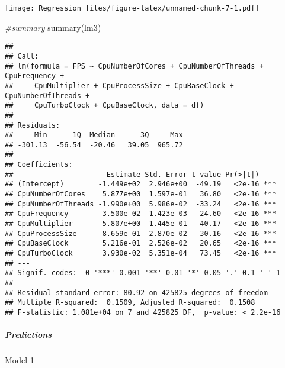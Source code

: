 \documentclass[
]{article}
\newenvironment{Shaded}{\begin{snugshade}}{\end{snugshade}}
\newcommand{\AttributeTok}[1]{\textcolor[rgb]{0.77,0.63,0.00}{#1}}
\newcommand{\CommentTok}[1]{\textcolor[rgb]{0.56,0.35,0.01}{\textit{#1}}}
\newcommand{\DecValTok}[1]{\textcolor[rgb]{0.00,0.00,0.81}{#1}}
\newcommand{\FunctionTok}[1]{\textcolor[rgb]{0.00,0.00,0.00}{#1}}
\newcommand{\NormalTok}[1]{#1}
\newcommand{\OtherTok}[1]{\textcolor[rgb]{0.56,0.35,0.01}{#1}}
\newcommand{\SpecialCharTok}[1]{\textcolor[rgb]{0.00,0.00,0.00}{#1}}
\begin{document}
\texttt{[image: Regression\_files/figure-latex/unnamed-chunk-7-1.pdf]}

\begin{Shaded}
\begin{Highlighting}[]
\CommentTok{\#summary}
\FunctionTok{summary}\NormalTok{(lm3)}
\end{Highlighting}
\end{Shaded}

\begin{verbatim}
## 
## Call:
## lm(formula = FPS ~ CpuNumberOfCores + CpuNumberOfThreads + CpuFrequency + 
##     CpuMultiplier + CpuProcessSize + CpuBaseClock + CpuNumberOfThreads + 
##     CpuTurboClock + CpuBaseClock, data = df)
## 
## Residuals:
##     Min      1Q  Median      3Q     Max 
## -301.13  -56.54  -20.46   39.05  965.72 
## 
## Coefficients:
##                      Estimate Std. Error t value Pr(>|t|)    
## (Intercept)        -1.449e+02  2.946e+00  -49.19   <2e-16 ***
## CpuNumberOfCores    5.877e+00  1.597e-01   36.80   <2e-16 ***
## CpuNumberOfThreads -1.990e+00  5.986e-02  -33.24   <2e-16 ***
## CpuFrequency       -3.500e-02  1.423e-03  -24.60   <2e-16 ***
## CpuMultiplier       5.807e+00  1.445e-01   40.17   <2e-16 ***
## CpuProcessSize     -8.659e-01  2.870e-02  -30.16   <2e-16 ***
## CpuBaseClock        5.216e-01  2.526e-02   20.65   <2e-16 ***
## CpuTurboClock       3.930e-02  5.351e-04   73.45   <2e-16 ***
## ---
## Signif. codes:  0 '***' 0.001 '**' 0.01 '*' 0.05 '.' 0.1 ' ' 1
## 
## Residual standard error: 80.92 on 425825 degrees of freedom
## Multiple R-squared:  0.1509, Adjusted R-squared:  0.1508 
## F-statistic: 1.081e+04 on 7 and 425825 DF,  p-value: < 2.2e-16
\end{verbatim}

\hypertarget{predictions}{%
\subparagraph{Predictions}\label{predictions}}

Model 1

\begin{Shaded}
\end{Shaded}
\end{document}
